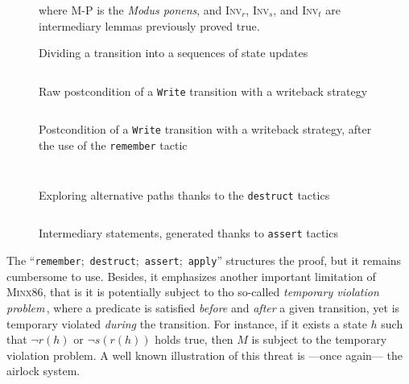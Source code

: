 \begin{figure}
{  \vspace{0.5cm} where {\scshape M-P} is the \emph{Modus ponens}, and {\scshape
    Inv}\( _r \), {\scshape Inv}\( _s \), and {\scshape Inv}\( _t \) are
  intermediary lemmas previously proved true.%
}

\caption{Dividing a transition into a sequences of state updates}
\label{freespec:figure:seqproof}
\end{figure}

\begin{figure}
  \inputminted{coq}{Listings/StateHell.v}

  \caption{Raw postcondition of a \texttt{Write} transition with a writeback
    strategy}
  \label{fig:freespec:entrypoint}
\end{figure}

\begin{figure}
  \inputminted{coq}{Listings/RememberPattern.v}

  \caption{Postcondition of a \texttt{Write} transition with a writeback
    strategy, after the use of the \texttt{remember} tactic}
  \label{fig:freespec:remember}
\end{figure}

\begin{figure}
  \inputminted{coq}{Listings/DestructGoal.v}

  \inputminted{coq}{Listings/DestructGoal2.v}

  \caption{Exploring alternative paths thanks to the \texttt{destruct} tactics}
  \label{fig:freespec:destruct}
\end{figure}

\begin{figure}
  \inputminted{coq}{Listings/InvGoals.v}

  \caption{Intermediary statements, generated thanks to \texttt{assert} tactics}
  \label{fig:freespec:assert}
\end{figure}

The ``\texttt{remember};~\texttt{destruct};~\texttt{assert};~\texttt{apply}''
structures the proof, but it remains cumbersome to use.
%
Besides, it emphasizes another important limitation of {\scshape Minx86}, that
is it is potentially subject to tho so-called \emph{temporary violation
  problem}\,\cite{muller2006tempviolation}, where a predicate is satisfied
\emph{before} and \emph{after} a given transition, yet is temporary violated
\emph{during} the transition.
%
For instance, if it exists a state \( h \) such that \( \neg r(h) \) or
\( \neg s(r(h)) \) holds true, then \( M \) is subject to the temporary
violation problem.
%
A well known illustration of this threat is ---once again--- the airlock system.

